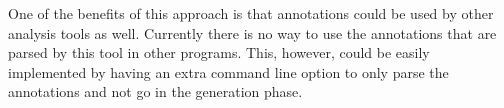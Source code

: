 \documentclass[a4paper]{article}
\begin{document}
One of the benefits of this approach is that annotations could be used by other analysis tools as well. Currently there is no way to use the annotations that are parsed by this tool in other programs. This, however, could be easily implemented by having an extra command line option to only parse the annotations and not go in the generation phase. 

\newpage


\end{document}
